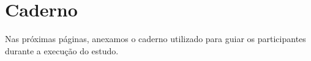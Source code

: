 \chapter{Caderno}
\label{ape:caderno}

Nas próximas páginas, anexamos o caderno utilizado para guiar
os participantes durante a execução do estudo.

